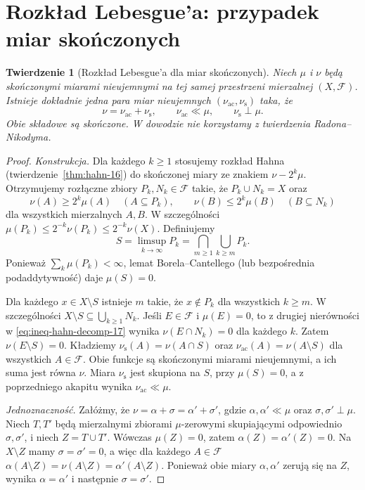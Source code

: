 \documentclass[11pt,a4paper,oneside]{book}
\numberwithin{equation}{chapter}
\theoremstyle{plain}
\newtheorem{twierdzenie}{Twierdzenie}[chapter]
\theoremstyle{definition}
\theoremstyle{remark}
\begin{document}
\section{Rozkład Lebesgue'a: przypadek miar skończonych}
\begin{twierdzenie}[Rozkład Lebesgue'a dla miar skończonych]
\label{thm:lebesgue-decomp-finite-17}
Niech $\mu$ i $\nu$ będą skończonymi miarami nieujemnymi
na tej samej przestrzeni mierzalnej $(X,\mathcal F)$.
Istnieje dokładnie jedna para miar nieujemnych
$(\nu_{\mathrm{ac}},\nu_{\mathrm{s}})$ taka, że
\begin{equation}\label{eq:decomp-finite-17}
\nu=\nu_{\mathrm{ac}}+\nu_{\mathrm{s}},\qquad
\nu_{\mathrm{ac}}\ll\mu,\qquad \nu_{\mathrm{s}}\perp\mu.
\end{equation}
Obie składowe są skończone. W dowodzie nie korzystamy
z twierdzenia Radona--Nikodyma.
\end{twierdzenie}
\begin{proof}
\emph{Konstrukcja.} Dla każdego $k\ge1$ stosujemy rozkład
Hahna (twierdzenie~\ref{thm:hahn-16}) do skończonej miary
ze znakiem $\nu-2^k\mu$. Otrzymujemy rozłączne zbiory
$P_k,N_k\in\mathcal F$ takie, że
$P_k\cup N_k=X$ oraz
\begin{equation}\label{eq:ineq-hahn-decomp-17}
\nu(A)\ge2^k\mu(A)\quad(A\subseteq P_k),\qquad
\nu(B)\le2^k\mu(B)\quad(B\subseteq N_k)
\end{equation}
dla wszystkich mierzalnych $A,B$. W szczególności
$\mu(P_k)\le2^{-k}\nu(P_k)\le2^{-k}\nu(X)$.
Definiujemy
\[
S=\limsup_{k\to\infty}P_k
  =\bigcap_{m\ge1}\bigcup_{k\ge m}P_k.
\]
Ponieważ $\sum_k\mu(P_k)<\infty$, lemat
Borela--Cantellego (lub bezpośrednia podaddytywność)
daje $\mu(S)=0$.

Dla każdego $x\in X\setminus S$ istnieje $m$ takie,
że $x\notin P_k$ dla wszystkich $k\ge m$.
W szczególności
$X\setminus S\subseteq\bigcup_{k\ge1}N_k$.
Jeśli $E\in\mathcal F$ i $\mu(E)=0$, to z drugiej
nierówności w \eqref{eq:ineq-hahn-decomp-17} wynika
$\nu(E\cap N_k)=0$ dla każdego $k$.
Zatem $\nu(E\setminus S)=0$.
Kładziemy
$\nu_{\mathrm{s}}(A)=\nu(A\cap S)$ oraz
$\nu_{\mathrm{ac}}(A)=\nu(A\setminus S)$
dla wszystkich $A\in\mathcal F$.
Obie funkcje są skończonymi miarami nieujemnymi,
a ich suma jest równa $\nu$.
Miara $\nu_{\mathrm{s}}$ jest skupiona na $S$,
przy $\mu(S)=0$, a z poprzedniego akapitu
wynika $\nu_{\mathrm{ac}}\ll\mu$.

\emph{Jednoznaczność.} Załóżmy, że
$\nu=\alpha+\sigma=\alpha'+\sigma'$,
gdzie $\alpha,\alpha'\ll\mu$ oraz
$\sigma,\sigma'\perp\mu$. Niech $T,T'$ będą
mierzalnymi zbiorami $\mu$-zerowymi skupiającymi
odpowiednio $\sigma,\sigma'$, i niech $Z=T\cup T'$.
Wówczas $\mu(Z)=0$, zatem $\alpha(Z)=\alpha'(Z)=0$.
Na $X\setminus Z$ mamy $\sigma=\sigma'=0$,
a więc dla każdego $A\in\mathcal F$
$\alpha(A\setminus Z)=\nu(A\setminus Z)=\alpha'(A\setminus Z)$.
Ponieważ obie miary $\alpha,\alpha'$ zerują się na $Z$,
wynika $\alpha=\alpha'$ i następnie $\sigma=\sigma'$.
\end{proof}
\end{document}
